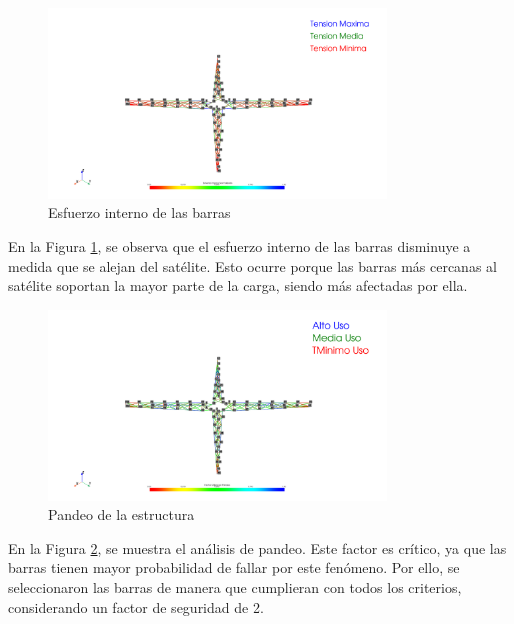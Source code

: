 \begin{figure}[H]
    \centering
    \includegraphics[width=0.8\textwidth]{GRAFICOS_DISENO_LUKAS/esfuerzo_barras_inercia.png}
    \caption{Esfuerzo interno de las barras}
    \label{fig:propuesta1_ei}
\end{figure}

En la Figura \ref{fig:propuesta1_ei}, se observa que el esfuerzo interno de las barras disminuye a medida que se alejan del satélite. Esto ocurre porque las barras más cercanas al satélite soportan la mayor parte de la carga, siendo más afectadas por ella.

\begin{figure}[H]
    \centering
    \includegraphics[width=0.8\textwidth]{GRAFICOS_DISENO_LUKAS/factor_utilizacion_pandeo.png}
    \caption{Pandeo de la estructura}
    \label{fig:propuesta1_pandeo}
\end{figure}

En la Figura \ref{fig:propuesta1_pandeo}, se muestra el análisis de pandeo. Este factor es crítico, ya que las barras tienen mayor probabilidad de fallar por este fenómeno. Por ello, se seleccionaron las barras de manera que cumplieran con todos los criterios, considerando un factor de seguridad de 2.

